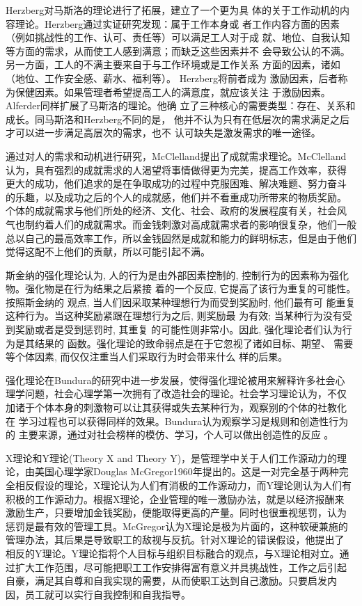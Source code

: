 \documentclass[12pt,a4paper]{ctexart}
\begin{document}
Herzberg对马斯洛的理论进行了拓展，建立了一个更为具
体的关于工作动机的内容理论。Herzberg通过实证研究发现：属于工作本身或
者工作内容方面的因素（例如挑战性的工作、认可、责任等）可以满足工人对于成
就、地位、自我认知等方面的需求，从而使工人感到满意；而缺乏这些因素并不
会导致公认的不满。另一方面，工人的不满主要来自于与工作环境或是工作关系
方面的因素，诸如（地位、工作安全感、薪水、福利等）。
Herzberg将前者成为
激励因素，后者称为保健因素。如果管理者希望提高工人的满意度，就应该关注
于激励因素\cite{hertzberg1959mw}。Alferder同样扩展了马斯洛的理论。他确
立了三种核心的需要类型：存在、关系和成长。同马斯洛和Herzberg不同的是，
他并不认为只有在低层次的需求满足之后才可以进一步满足高层次的需求，也不
认可缺失是激发需求的唯一途径\cite{alderfer:era}。

通过对人的需求和动机进行研究，McClelland提出了成就需求理论。McClelland
认为，具有强烈的成就需求的人渴望将事情做得更为完美，提高工作效率，获得
更大的成功，他们追求的是在争取成功的过程中克服困难、解决难题、努力奋斗
的乐趣，以及成功之后的个人的成就感，他们并不看重成功所带来的物质奖励。
个体的成就需求与他们所处的经济、文化、社会、政府的发展程度有关，社会风
气也制约着人们的成就需求。而金钱刺激对高成就需求者的影响很复杂，他们一般总以自己的最高效率工作，所以金钱固然是成就和能力的鲜明标志，但是由于他们觉得这配不上他们的贡献，所以可能引起不满\cite{mcclelland1976am}。

斯金纳的强化理论认为, 人的行为是由外部因素控制的,
控制行为的因素称为强化物。强化物是在行为结果之后紧接
着的一个反应, 它提高了该行为重复的可能性。按照斯金纳的
观点, 当人们因采取某种理想行为而受到奖励时, 他们最有可
能重复这种行为。当这种奖励紧跟在理想行为之后, 则奖励最
为有效; 当某种行为没有受到奖励或者是受到惩罚时, 其重复
的可能性则非常小。因此, 强化理论者们认为行为是其结果的
函数\cite{skinner1938boe}\cite{ferster1957sr}。强化理论的致命弱点是在于它忽视了诸如目标、期望、
需要等个体因素, 而仅仅注重当人们采取行为时会带来什么
样的后果。

强化理论在Bundura的研究中进一步发展，使得强化理论被用来解释许多社会心
理学问题，社会心理学第一次拥有了改造社会的理论。社会学习理论认为，不仅
加诸于个体本身的刺激物可以让其获得或失去某种行为，观察别的个体的社教化
在
学习过程也可以获得同样的效果。Bundura认为观察学习是规则和创造性行为的
主要来源，通过对社会榜样的模仿、学习，个人可以做出创造性的反应
\cite{bundura1977slt}。

X理论和Y理论(Theory X and Theory Y)，是管理学中关于人们工作源动力的理
论，由美国心理学家Douglas McGregor1960年提出的。这是一对完全基于两种完
全相反假设的理论，X理论认为人们有消极的工作源动力，而Y理论则认为人们有
积极的工作源动力。根据X理论，企业管理的唯一激励办法，就是以经济报酬来
激励生产，只要增加金钱奖励，便能取得更高的产量。同时也很重视惩罚，认为
惩罚是最有效的管理工具。McGregor认为X理论是极为片面的，这种软硬兼施的
管理办法，其后果是导致职工的敌视与反抗。针对X理论的错误假设，他提出了
相反的Y理论。Y理论指将个人目标与组织目标融合的观点，与X理论相对立。通
过扩大工作范围，尽可能把职工工作安排得富有意义并具挑战性，工作之后引起
自豪，满足其自尊和自我实现的需要，从而使职工达到自己激励。只要启发内
因，员工就可以实行自我控制和自我指导\cite{mcgregor2006hse}。
\end{document}
